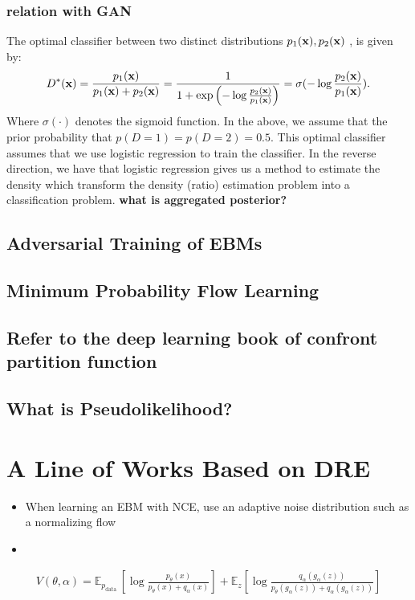 \documentclass{article}
\begin{document}
\subsubsection{relation with GAN}
The optimal classifier between two distinct distributions $p_1({\mathbf{x}}), p_2({\mathbf{x}})$ , is given by: 
$$D^*({\mathbf{x}}) = \frac{p_1({\mathbf{x}})}{p_1({\mathbf{x}}) + p_2({\mathbf{x}})} = \frac{1}{1 + \exp\left( -\log \frac{p_2({\mathbf{x}})}{p_1({\mathbf{x}})} \right)} = \sigma(-\log \frac{p_2({\mathbf{x}})}{p_1({\mathbf{x}})}).$$
Where $\sigma(\cdot)$ denotes the sigmoid function. In the above, we assume that the prior probability that $p(D=1) = p(D=2) = 0.5$.
This optimal classifier assumes that we use logistic regression to train the classifier. In the reverse direction, we have that logistic regression gives us a method to estimate the density which transform the density (ratio) estimation problem into a classification problem.
\textbf{what is aggregated posterior?}\\

\subsection{Adversarial Training of EBMs}

\subsection{Minimum Probability Flow Learning}


\subsection{Refer to the deep learning book of confront partition function}


\subsection{What is Pseudolikelihood?}

\section{A Line of Works Based on DRE}
\begin{itemize}
    \item When learning an EBM with NCE, use an adaptive noise distribution such as a normalizing flow
    \item 
\end{itemize}
\begin{align}
    V(\theta, \alpha) =\mathbb{E}_{p_{\text {data }}}\left[\log \frac{p_\theta(x)}{p_\theta(x)+q_\alpha(x)}\right] +\mathbb{E}_z\left[\log \frac{q_\alpha\left(g_\alpha(z)\right)}{p_\theta\left(g_\alpha(z)\right)+q_\alpha\left(g_\alpha(z)\right)}\right]
\end{align}
\end{document}
